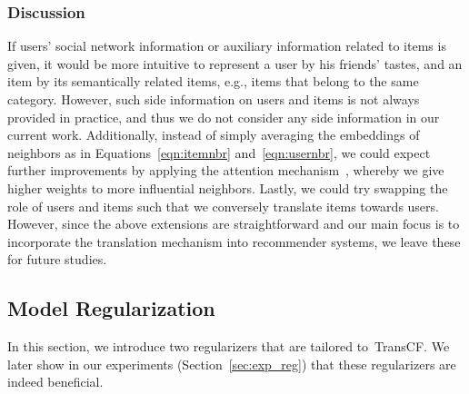 \documentclass[conference]{IEEEtran}
\newcommand{\propose}{\textsf{{TransCF}}}
\begin{document}
\subsubsection{\textbf{Discussion}}
\label{sec:discussion}
If users' social network information or auxiliary information related to items is given, it would be more intuitive to represent a user by his friends' tastes, and an item by its semantically related items, e.g., items that belong to the same category. However, such side information on users and items is not always provided in practice, and thus we do not consider any side information in our current work. 
Additionally, instead of simply averaging the embeddings of neighbors as in Equations~\ref{eqn:itemnbr} and~\ref{eqn:usernbr}, we could expect further improvements by applying the attention mechanism~\cite{bahdanau2014neural}, whereby we 
give higher weights to more influential neighbors.
Lastly, we could try swapping the role of users and items such that we conversely translate items towards users.
However, since the above extensions are straightforward and our main focus is to incorporate the translation mechanism into recommender systems, we leave these for future studies.



\subsection{Model Regularization}
\vspace{-0.5ex}
In this section, we introduce two regularizers that are tailored to~\propose.
We later show in our experiments (Section~\ref{sec:exp_reg}) that these regularizers are indeed beneficial.

\medskip
\end{document}
